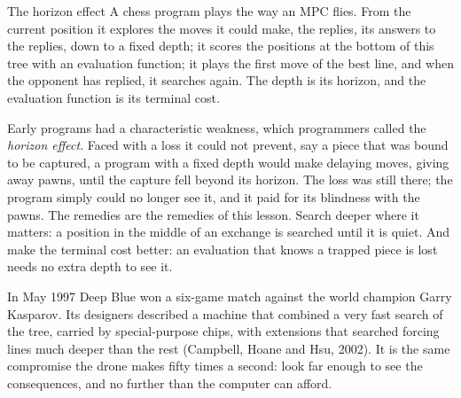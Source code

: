 \begin{curiosity}{The horizon effect}
A chess program plays the way an MPC flies. From the current position it explores the moves it could make, the replies, its answers to the replies, down to a fixed depth; it scores the positions at the bottom of this tree with an evaluation function; it plays the first move of the best line, and when the opponent has replied, it searches again. The depth is its horizon, and the evaluation function is its terminal cost.

Early programs had a characteristic weakness, which programmers called the \emph{horizon effect}. Faced with a loss it could not prevent, say a piece that was bound to be captured, a program with a fixed depth would make delaying moves, giving away pawns, until the capture fell beyond its horizon. The loss was still there; the program simply could no longer see it, and it paid for its blindness with the pawns. The remedies are the remedies of this lesson. Search deeper where it matters: a position in the middle of an exchange is searched until it is quiet. And make the terminal cost better: an evaluation that knows a trapped piece is lost needs no extra depth to see it.

In May 1997 Deep Blue won a six-game match against the world champion Garry Kasparov. Its designers described a machine that combined a very fast search of the tree, carried by special-purpose chips, with extensions that searched forcing lines much deeper than the rest (Campbell, Hoane and Hsu, 2002). It is the same compromise the drone makes fifty times a second: look far enough to see the consequences, and no further than the computer can afford.
\end{curiosity}

